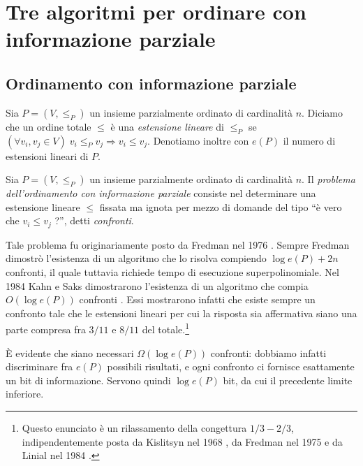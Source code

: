 \chapter{Tre algoritmi per ordinare con informazione parziale}

\section{Ordinamento con informazione parziale} 
\begin{definition}
	Sia \(P=\left(V,\le_{P}\right)\) un insieme parzialmente ordinato di cardinalit\`a \(n\). Diciamo che un ordine totale \(\le\) \`e una \emph{estensione lineare} di \(\le_{P}\) se \((\forall v_i, v_j\in V)\;v_i\le_{P} v_j\Rightarrow v_i\le v_j\). Denotiamo inoltre con \(e(P)\) il numero di estensioni lineari di \(P\). 
\end{definition}
\begin{definition}
	Sia \(P=(V,\le_{P})\) un insieme parzialmente ordinato di cardinalit\`a \(n\). Il \emph{problema dell'ordinamento con informazione parziale} consiste nel determinare una estensione lineare \(\le\) fissata ma ignota per mezzo di domande del tipo ``\`e vero che \(v_i\le v_j\) ?'', detti \emph{confronti}. 
\end{definition}

Tale problema fu originariamente posto da Fredman nel 1976 \cite{Fredman1976}. Sempre Fredman dimostrò l'esistenza di un algoritmo che lo risolva compiendo \(\log{e(P)} + 2n\) confronti, il quale tuttavia richiede tempo di esecuzione superpolinomiale. Nel 1984 Kahn e Saks dimostrarono l'esistenza di un algoritmo che compia \(O(\log{e(P)})\) confronti \cite{Kahn1984}. Essi mostrarono infatti che esiste sempre un confronto tale che le estensioni lineari per cui la risposta sia affermativa siano una parte compresa fra \(3/11\) e \(8/11\) del totale.\footnote{Questo enunciato è un rilassamento della congettura \(1/3-2/3\), indipendentemente posta da Kislitsyn nel 1968 \cite{Kislitsyn1968}, da Fredman nel 1975 e da Linial nel 1984 \cite{Linial1984}.}

È evidente che siano necessari \(\Omega(\log{e(P)})\) confronti: dobbiamo infatti discriminare fra \(e(P)\) possibili risultati, e ogni confronto ci fornisce esattamente un bit di informazione. Servono quindi \(\log{e(P)}\) bit, da cui il precedente limite inferiore.

